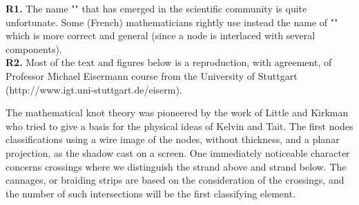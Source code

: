 {	\begin{tcolorbox}[title=Remarks,colframe=black,arc=10pt]
	\textbf{R1.} The name "" that has emerged in the scientific community is quite unfortunate. Some (French)  mathematicians rightly use instead the name of "" which is more correct and general (since a node is interlaced with several components).\\
	
	\textbf{R2.} Most of the text and figures below is a reproduction, with agreement, of Professor Michael Eisermann course from the University of Stuttgart (http://www.igt.uni-stuttgart.de/eiserm).
	\end{tcolorbox}	
	
		The mathematical knot theory was pioneered by the work of Little and Kirkman who tried to give a basis for the physical ideas of Kelvin and Tait. The first nodes classifications using a wire image of the nodes, without thickness, and a planar projection, as the shadow cast on a screen. One immediately noticeable character concerns crossings where we distinguish the strand above and strand below. The cannages, or braiding strips are based on the consideration of the crossings, and the number of such intersections will be the first classifying element.
		
}
